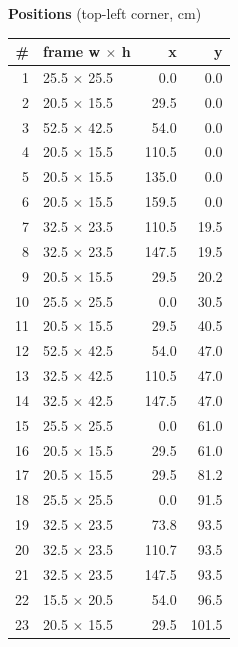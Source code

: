 \documentclass[a4paper,landscape,10pt]{article}
\begin{document}
\begin{minipage}[t]{0.25\textwidth}
\vspace{8pt}
{\bfseries Positions} (top-left corner, cm)\\[2pt]
\tiny
\begin{tabular}{@{}r l r r@{}}
\toprule
\# & frame w $\times$ h & x & y \\
\midrule
1 & 25.5 $\times$ 25.5 & 0.0 & 0.0 \\
2 & 20.5 $\times$ 15.5 & 29.5 & 0.0 \\
3 & 52.5 $\times$ 42.5 & 54.0 & 0.0 \\
4 & 20.5 $\times$ 15.5 & 110.5 & 0.0 \\
5 & 20.5 $\times$ 15.5 & 135.0 & 0.0 \\
6 & 20.5 $\times$ 15.5 & 159.5 & 0.0 \\
7 & 32.5 $\times$ 23.5 & 110.5 & 19.5 \\
8 & 32.5 $\times$ 23.5 & 147.5 & 19.5 \\
9 & 20.5 $\times$ 15.5 & 29.5 & 20.2 \\
10 & 25.5 $\times$ 25.5 & 0.0 & 30.5 \\
11 & 20.5 $\times$ 15.5 & 29.5 & 40.5 \\
12 & 52.5 $\times$ 42.5 & 54.0 & 47.0 \\
13 & 32.5 $\times$ 42.5 & 110.5 & 47.0 \\
14 & 32.5 $\times$ 42.5 & 147.5 & 47.0 \\
15 & 25.5 $\times$ 25.5 & 0.0 & 61.0 \\
16 & 20.5 $\times$ 15.5 & 29.5 & 61.0 \\
17 & 20.5 $\times$ 15.5 & 29.5 & 81.2 \\
18 & 25.5 $\times$ 25.5 & 0.0 & 91.5 \\
19 & 32.5 $\times$ 23.5 & 73.8 & 93.5 \\
20 & 32.5 $\times$ 23.5 & 110.7 & 93.5 \\
21 & 32.5 $\times$ 23.5 & 147.5 & 93.5 \\
22 & 15.5 $\times$ 20.5 & 54.0 & 96.5 \\
23 & 20.5 $\times$ 15.5 & 29.5 & 101.5 \\
\bottomrule
\end{tabular}
\end{minipage}
\clearpage
\end{document}
